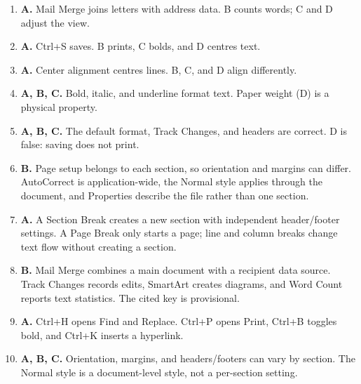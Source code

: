 \begin{enumerate}[label=\textbf{Q\arabic*.}, leftmargin=*]
\item \textbf{A.} Mail Merge joins letters with address data. B counts words; C and D adjust the view.
\item \textbf{A.} Ctrl+S saves. B prints, C bolds, and D centres text.
\item \textbf{A.} Center alignment centres lines. B, C, and D align differently.
\item \textbf{A, B, C.} Bold, italic, and underline format text. Paper weight (D) is a physical property.
\item \textbf{A, B, C.} The default format, Track Changes, and headers are correct. D is false: saving does not print.
\item \textbf{B.} Page setup belongs to each section, so orientation and margins can differ.
  AutoCorrect is application-wide, the Normal style applies through the document,
  and Properties describe the file rather than one section.

\item \textbf{A.} A Section Break creates a new section with independent header/footer
  settings. A Page Break only starts a page; line and column breaks change text
  flow without creating a section.

\item \textbf{B.} Mail Merge combines a main document with a recipient data source. Track
  Changes records edits, SmartArt creates diagrams, and Word Count reports text
  statistics. The cited key is provisional.

\item \textbf{A.} Ctrl+H opens Find and Replace. Ctrl+P opens Print, Ctrl+B toggles bold, and
  Ctrl+K inserts a hyperlink.

\item \textbf{A, B, C.} Orientation, margins, and headers/footers can vary by section. The
  Normal style is a document-level style, not a per-section setting.

\end{enumerate}
